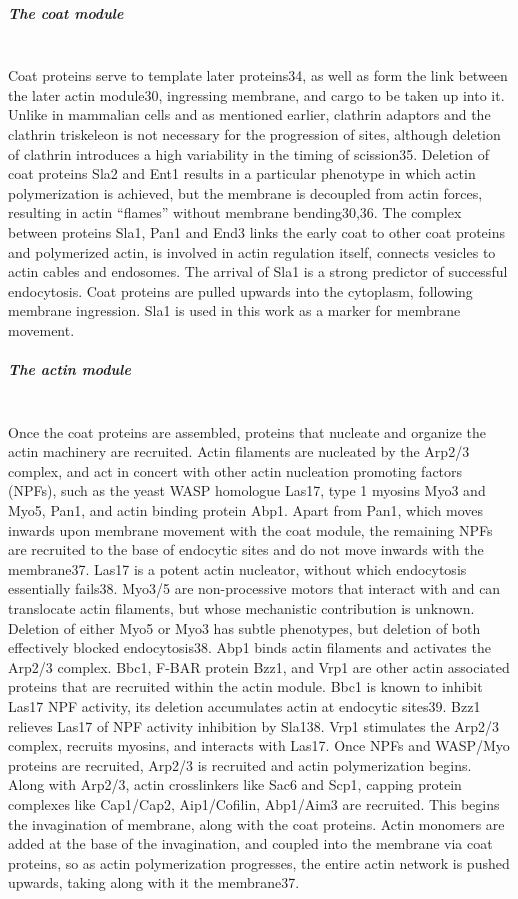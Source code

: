 			\subparagraph{The coat module}
			\mbox{} \\
			Coat proteins serve to template later proteins34, as well as form the link between the later actin module30, ingressing membrane, and cargo to be taken up into it. Unlike in mammalian cells and as mentioned earlier, clathrin adaptors and the clathrin triskeleon is not necessary for the progression of sites, although deletion of clathrin introduces a high variability in the timing of scission35. 
			\vspace{5mm}
			Deletion of coat proteins Sla2 and Ent1 results in a particular phenotype in which actin polymerization is achieved, but the membrane is decoupled from actin forces, resulting in actin “flames” without membrane bending30,36. The complex between proteins Sla1, Pan1 and End3 links the early coat to other coat proteins and polymerized actin, is involved in actin regulation itself, connects vesicles to actin cables and endosomes. The arrival of Sla1 is a strong predictor of successful endocytosis. Coat proteins are pulled upwards into the cytoplasm, following membrane ingression. Sla1 is used in this work as a marker for membrane movement.

			\subparagraph{The actin module}
			\mbox{} \\
			Once the coat proteins are assembled, proteins that nucleate and organize the actin machinery are recruited. Actin filaments are nucleated by the Arp2/3 complex, and act in concert with other actin nucleation promoting factors (NPFs), such as the yeast WASP homologue Las17, type 1 myosins Myo3 and Myo5, Pan1, and actin binding protein Abp1. Apart from Pan1, which moves inwards upon membrane movement with the coat module, the remaining NPFs are recruited to the base of endocytic sites and do not move inwards with the membrane37. 
			\vspace{5mm}
			Las17 is a potent actin nucleator, without which endocytosis essentially fails38. Myo3/5 are non-processive motors that interact with and can translocate actin filaments, but whose mechanistic contribution is unknown. Deletion of either Myo5 or Myo3 has subtle phenotypes, but deletion of both effectively blocked endocytosis38. Abp1 binds actin filaments and activates the Arp2/3 complex. 
			\vspace{5mm}
			Bbc1, F-BAR protein Bzz1, and Vrp1 are other actin associated proteins that are recruited within the actin module. Bbc1 is known to inhibit Las17 NPF activity, its deletion accumulates actin at endocytic sites39. Bzz1 relieves Las17 of NPF activity inhibition by Sla138. Vrp1 stimulates the Arp2/3 complex, recruits myosins, and interacts with Las17. 
			\vspace{5mm}
			Once NPFs and WASP/Myo proteins are recruited, Arp2/3 is recruited and actin polymerization begins. Along with Arp2/3, actin crosslinkers like Sac6 and Scp1, capping protein complexes like Cap1/Cap2, Aip1/Cofilin, Abp1/Aim3 are recruited. This begins the invagination of membrane, along with the coat proteins. Actin monomers are added at the base of the invagination, and coupled into the membrane via coat proteins, so as actin polymerization progresses, the entire actin network is pushed upwards, taking along with it the membrane37.

